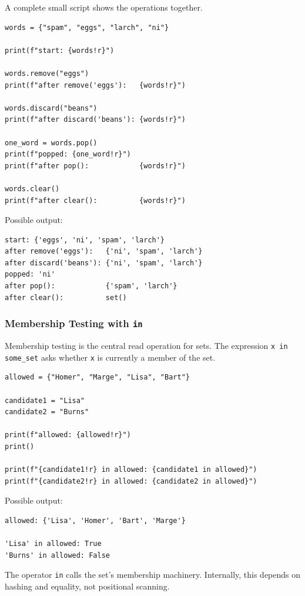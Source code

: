 A complete small script shows the operations together.

\begin{verbatim}
words = {"spam", "eggs", "larch", "ni"}

print(f"start: {words!r}")

words.remove("eggs")
print(f"after remove('eggs'):   {words!r}")

words.discard("beans")
print(f"after discard('beans'): {words!r}")

one_word = words.pop()
print(f"popped: {one_word!r}")
print(f"after pop():            {words!r}")

words.clear()
print(f"after clear():          {words!r}")
\end{verbatim}

Possible output:

\begin{verbatim}
start: {'eggs', 'ni', 'spam', 'larch'}
after remove('eggs'):   {'ni', 'spam', 'larch'}
after discard('beans'): {'ni', 'spam', 'larch'}
popped: 'ni'
after pop():            {'spam', 'larch'}
after clear():          set()
\end{verbatim}

\subsubsection{Membership Testing with \texttt{in}}

Membership testing is the central read operation for sets. The expression \texttt{x in some\_set} asks whether \texttt{x} is currently a member of the set.

\begin{verbatim}
allowed = {"Homer", "Marge", "Lisa", "Bart"}

candidate1 = "Lisa"
candidate2 = "Burns"

print(f"allowed: {allowed!r}")
print()

print(f"{candidate1!r} in allowed: {candidate1 in allowed}")
print(f"{candidate2!r} in allowed: {candidate2 in allowed}")
\end{verbatim}

Possible output:

\begin{verbatim}
allowed: {'Lisa', 'Homer', 'Bart', 'Marge'}

'Lisa' in allowed: True
'Burns' in allowed: False
\end{verbatim}

The operator \texttt{in} calls the set's membership machinery. Internally, this depends on hashing and equality, not positional scanning.

